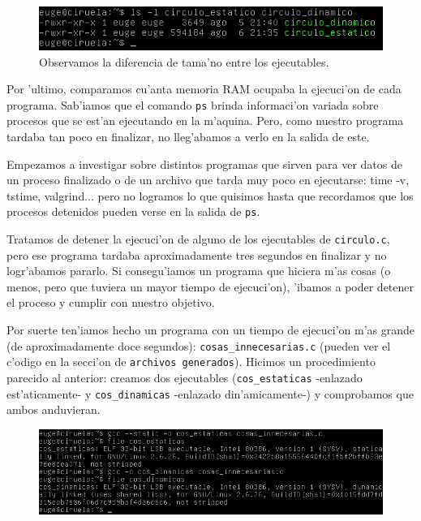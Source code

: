\documentclass[11pt]{article}
\begin{document}

		\begin{figure}[H]
    			\centering
    			\includegraphics[scale=0.8]{Images/Seccion 1/bytes_circulos.png}
    			\caption{Observamos la diferencia de tama'no entre los ejecutables.}
    			\label{fig:bytes_circulos}
		\end{figure}

		Por 'ultimo, comparamos cu'anta memoria RAM ocupaba la ejecuci'on de cada programa. Sab'iamos que el comando \texttt{ps} %
brinda informaci'on variada sobre procesos que se est'an ejecutando en la m'aquina. Pero, como nuestro programa tardaba tan poco en finalizar, no lleg'abamos a verlo en la salida de este.

		Empezamos a investigar sobre distintos programas que sirven para ver datos de un proceso finalizado o de un archivo que tarda muy poco en ejecutarse: time -v, tstime, valgrind... pero no logramos lo que quisimos hasta que recordamos que los procesos detenidos pueden verse en la salida de \texttt{ps}.

		Tratamos de detener la ejecuci'on de alguno de los ejecutables %
de \texttt{circulo.c}, pero ese programa tardaba aproximadamente tres segundos en finalizar y no logr'abamos pararlo. Si consegu'iamos un programa que hiciera m'as cosas (o menos, pero que tuviera un mayor tiempo de ejecuci'on), 'ibamos a poder detener el proceso y cumplir con nuestro objetivo.

		Por suerte ten'iamos hecho un programa con un tiempo de ejecuci'on m'as grande (de aproximadamente doce segundos): \texttt{cosas\_innecesarias.c} \label{cosas_innecesarias} (pueden ver el c'odigo en la secci'on de \texttt{archivos generados}). Hicimos un procedimiento parecido al anterior: creamos dos ejecutables (\texttt{cos\_estaticas} -enlazado est'aticamente- y \texttt{cos\_dinamicas} -enlazado din'amicamente-) y comprobamos que ambos anduvieran.

		\begin{figure}[H]
    			\centering
    			\includegraphics[scale=0.65]{Images/Seccion 1/innecesario.png}
    			\label{fig:innecesario}
		\end{figure}
\end{document}
